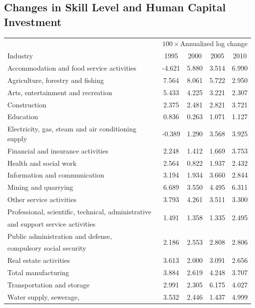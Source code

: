 \documentclass[12pt]{article}
\begin{document}
\begin{appendices}
\subsection{Changes in Skill Level and Human Capital Investment}
\begin{table}[h!]
\begin{center}
\scriptsize
\begin{tabular}{l|cccc} 
\hline \hline
& \multicolumn{4}{c}{$100 \times$Annualized log change} \\
Industry & 1995 & 2000 & 2005 & 2010  \\ \hline
Accommodation and food service activities & -4.621 & 5.880 & 3.514 & 6.990 \\
Agriculture, forestry and fishing & 7.564 & 8.061 & 5.722 & 2.950 \\ 
Arts, entertainment and recreation & 5.433 & 4.225 & 3.221 & 2.307 \\
Construction & 2.375 & 2.481 & 2.821 & 3.721 \\
Education & 0.836 & 0.263 & 1.071 & 1.127 \\
Electricity, gas, steam and air conditioning supply & -0.389 & 1.290 & 3.568 & 3.925 \\
Financial and insurance activities & 2.248 & 1.412 & 1.669 & 3.753 \\
Health and social work & 2.564 & 0.822 & 1.937 & 2.432 \\
Information and communication & 3.194 & 1.934 & 3.660 & 2.844 \\
Mining and quarrying & 6.689 & 3.550 & 4.495 & 6.311 \\
Other service activities & 3.793 & 4.261 & 3.511 & 3.300 \\
Professional, scientific, technical, administrative & \multirow{2}{*}{1.491} & \multirow{2}{*}{1.358} & \multirow{2}{*}{1.335} & \multirow{2}{*}{2.495} \\
and support service activities &&&&\\
Public administration and defense,  & \multirow{2}{*}{2.186} & \multirow{2}{*}{2.553} & \multirow{2}{*}{2.808} & \multirow{2}{*}{2.806}\\
compulsory social security &&&&\\
Real estate activities & 3.613 & 2.000 & 3.091 & 2.656 \\
Total manufacturing & 3.884 & 2.619 & 4.248 & 3.707 \\
Transportation and storage & 2.991 & 2.305 & 6.175 & 4.027 \\
Water supply, sewerage,  & \multirow{2}{*}{3.532} & \multirow{2}{*}{2.446} & \multirow{2}{*}{1.437} & \multirow{2}{*}{4.999}  \\

\end{tabular}
\end{center}
\end{table}
\end{appendices}
\end{document}
